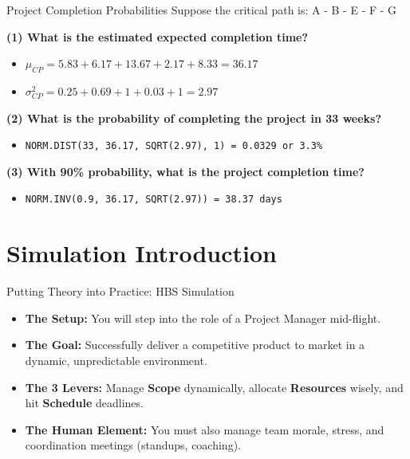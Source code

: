 \documentclass[11pt,aspectratio=169]{beamer}
\begin{document}
\begin{frame}{Project Completion Probabilities}
    Suppose the critical path is: A - B - E - F - G
    
    \vspace{1em}
    \textbf{(1) What is the estimated expected completion time?}
    \begin{itemize}
        \item $\mu_{CP} = 5.83 + 6.17 + 13.67 + 2.17 + 8.33 = 36.17$
        \item $\sigma_{CP}^2 = 0.25 + 0.69 + 1 + 0.03 + 1 = 2.97$
    \end{itemize}
    
    \vspace{1em}
    \textbf{(2) What is the probability of completing the project in 33 weeks?}
    \begin{itemize}
        \item \texttt{NORM.DIST(33, 36.17, SQRT(2.97), 1) = 0.0329 or 3.3\%}
    \end{itemize}
    
    \vspace{1em}
    \textbf{(3) With 90\% probability, what is the project completion time?}
    \begin{itemize}
        \item \texttt{NORM.INV(0.9, 36.17, SQRT(2.97)) = 38.37 days}
    \end{itemize}
\end{frame}

\section{Simulation Introduction}

\begin{frame}{Putting Theory into Practice: HBS Simulation}
    \begin{itemize}[<+->]
        \item \textbf{The Setup:} You will step into the role of a Project Manager mid-flight.
        \item \textbf{The Goal:} Successfully deliver a competitive product to market in a dynamic, unpredictable environment.
        \item \textbf{The 3 Levers:} Manage \textbf{Scope} dynamically, allocate \textbf{Resources} wisely, and hit \textbf{Schedule} deadlines.
        \item \textbf{The Human Element:} You must also manage team morale, stress, and coordination meetings (standups, coaching).
    \end{itemize}
\end{frame}
\end{document}
